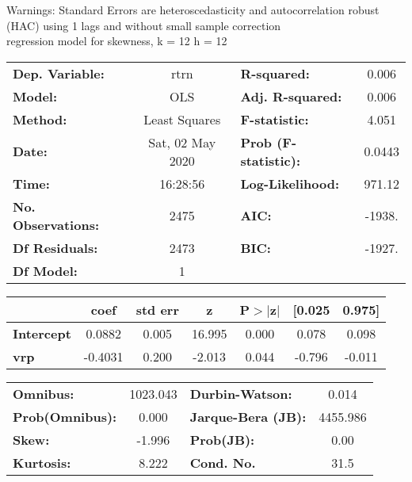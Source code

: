 Warnings: \newline
 [1] Standard Errors are heteroscedasticity and autocorrelation robust (HAC) using 1 lags and without small sample correction\\ 

regression model for skewness, k = 12 h = 12\begin{center}
\begin{tabular}{lclc}
\toprule
\textbf{Dep. Variable:}    &       rtrn       & \textbf{  R-squared:         } &     0.006   \\
\textbf{Model:}            &       OLS        & \textbf{  Adj. R-squared:    } &     0.006   \\
\textbf{Method:}           &  Least Squares   & \textbf{  F-statistic:       } &     4.051   \\
\textbf{Date:}             & Sat, 02 May 2020 & \textbf{  Prob (F-statistic):} &   0.0443    \\
\textbf{Time:}             &     16:28:56     & \textbf{  Log-Likelihood:    } &    971.12   \\
\textbf{No. Observations:} &        2475      & \textbf{  AIC:               } &    -1938.   \\
\textbf{Df Residuals:}     &        2473      & \textbf{  BIC:               } &    -1927.   \\
\textbf{Df Model:}         &           1      & \textbf{                     } &             \\
\bottomrule
\end{tabular}
\begin{tabular}{lcccccc}
                   & \textbf{coef} & \textbf{std err} & \textbf{z} & \textbf{P$> |$z$|$} & \textbf{[0.025} & \textbf{0.975]}  \\
\midrule
\textbf{Intercept} &       0.0882  &        0.005     &    16.995  &         0.000        &        0.078    &        0.098     \\
\textbf{vrp}       &      -0.4031  &        0.200     &    -2.013  &         0.044        &       -0.796    &       -0.011     \\
\bottomrule
\end{tabular}
\begin{tabular}{lclc}
\textbf{Omnibus:}       & 1023.043 & \textbf{  Durbin-Watson:     } &    0.014  \\
\textbf{Prob(Omnibus):} &   0.000  & \textbf{  Jarque-Bera (JB):  } & 4455.986  \\
\textbf{Skew:}          &  -1.996  & \textbf{  Prob(JB):          } &     0.00  \\
\textbf{Kurtosis:}      &   8.222  & \textbf{  Cond. No.          } &     31.5  \\
\bottomrule
\end{tabular}
\end{center}

